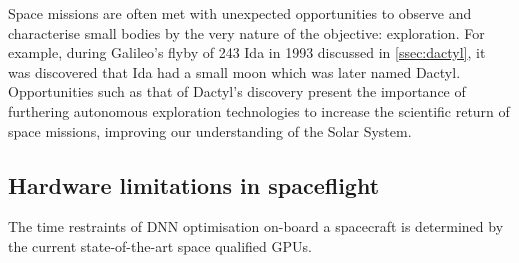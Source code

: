 Space missions are often met with unexpected opportunities to observe and characterise small bodies by the very nature of the objective: exploration. For example, during Galileo's flyby of 243 Ida in 1993 discussed in \autoref{ssec:dactyl}, it was discovered that Ida had a small moon which was later named Dactyl. Opportunities such as that of Dactyl's discovery present the importance of furthering autonomous exploration technologies to increase the scientific return of space missions, improving our understanding of the Solar System.

\subsection{Hardware limitations in spaceflight}\label{ssec:insight:hardware-limitations}
The time restraints of \gls{DNN} optimisation on-board a spacecraft is determined by the current state-of-the-art space qualified \glspl{GPU}.
